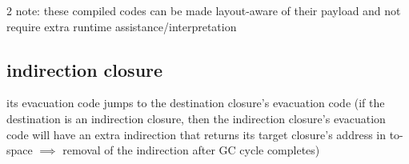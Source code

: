 \documentclass[8pt]{extarticle}
\begin{document}
\begin{multicols*}{2}
  note: these compiled codes can be made layout-aware of their payload and not require extra runtime assistance/interpretation

  \subsection{indirection closure}

  its evacuation code jumps to the destination closure's evacuation code (if the destination is an indirection closure, then the indirection closure's evacuation code will have an extra indirection that returns its target closure's address in to-space $\implies$ removal of the indirection after GC cycle completes)
  
  \vfill\null
  \columnbreak
    


    
\end{multicols*}
\end{document}

